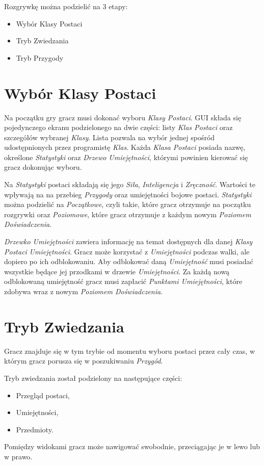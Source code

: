\documentclass[openright]{xmgr}
\begin{document}
Rozgrywkę można podzielić na 3 etapy:
\begin{itemize}
	\item Wybór Klasy Postaci
	\item Tryb Zwiedzania
	\item Tryb Przygody 
\end{itemize}
\section{Wybór Klasy Postaci}

Na początku gry gracz musi dokonać wyboru \textit{Klasy Postaci}. GUI składa się pojedynczego ekranu podzielonego na dwie części: listy \textit{Klas Postaci} oraz szczegółów wybranej \textit{Klasy}. Lista pozwala na wybór jednej spośród udostępnionych przez programistę \textit{Klas}. Każda \textit{Klasa Postaci} posiada nazwę, określone \textit{Statystyki} oraz \textit{Drzewo Umiejętności}, którymi powinien kierować się gracz dokonując wyboru.

Na \textit{Statystyki} postaci składają się  jego \textit{Siła}, \textit{Inteligencja} i \textit{Zręczność}. Wartości te wpływają na na przebieg \textit{Przygody} oraz umiejętności bojowe postaci. \textit{Statystyki} można podzielić na \textit{Początkowe}, czyli takie, które gracz otrzymuje na początku rozgrywki oraz \textit{Poziomowe}, które gracz otrzymuje z każdym nowym \textit{Poziomem Doświadczenia}.

\textit{Drzewko Umiejętności} zawiera informację na temat dostępnych dla danej \textit{Klasy Postaci} \textit{Umiejętności}. Gracz może korzystać z \textit{Umiejętności} podczas walki, ale dopiero po ich odblokowaniu. Aby odblokować daną \textit{Umiejętność} musi posiadać wszystkie będące jej przodkami w drzewie \textit{Umiejętności}. Za każdą nową odblokowaną umiejętność gracz musi zapłacić \textit{Punktami Umiejętności}, które zdobywa wraz z nowym \textit{Poziomem Doświadczenia}.

\section{Tryb Zwiedzania}

Gracz znajduje się w tym trybie od momentu wyboru postaci przez cały czas, w którym gracz porusza się w poszukiwaniu \textit{Przygód}. 

Tryb zwiedzania został podzielony na następujące części: 
\begin{itemize}
	\item Przegląd postaci,
	\item Umiejętności,
	\item Przedmioty.
\end{itemize}
Pomiędzy widokami gracz może nawigować swobodnie, przeciągając je w lewo lub w prawo.
\end{document}
